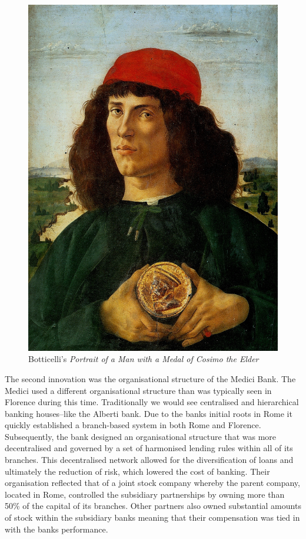 \begin{figure}[h!]
\centering
\includegraphics[width=\textwidth,height=0.75\textheight,keepaspectratio]{Images/botticelli.jpg}
\caption{Botticelli's \emph{Portrait of a Man with a Medal of Cosimo the Elder}}
\label{botticelli}
\end{figure}

The second innovation was the organisational structure of the Medici Bank. The Medici used a different organisational structure than was typically seen in Florence during this time. Traditionally we would see centralised and hierarchical banking houses--like the Alberti bank. Due to the banks initial roots in Rome it quickly established a branch-based system in both Rome and Florence. Subsequently, the bank designed an organisational structure that was more decentralised and governed by a set of harmonised lending rules within all of its branches. This decentralised network allowed for the diversification of loans and ultimately the reduction of risk, which lowered the cost of banking. Their organisation reflected that of a joint stock company whereby the parent company, located in Rome, controlled the subsidiary partnerships by owning more than 50\% of the capital of its branches. Other partners also owned substantial amounts of stock within the subsidiary banks meaning that their compensation was tied in with the banks performance.

